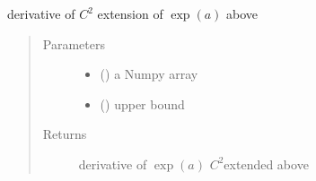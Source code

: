 \documentclass[letterpaper,10pt,english]{sphinxmanual}
\begin{document}
\begin{fulllineitems}
\label{\detokenize{ipfp_utils:ipfp_utils.der_npexp}}
derivative of \(C^2\) extension of  \(\exp(a)\) above 
\begin{quote}\begin{description}
\item[{Parameters}] \leavevmode\begin{itemize}
\item {} 
 () \textendash{} a Numpy array

\item {} 
 () \textendash{} upper bound

\end{itemize}

\item[{Returns}] \leavevmode
derivative of  \(\exp(a)\)  \(C^2\)\sphinxhyphen{}extended above 

\end{description}\end{quote}

\end{fulllineitems}

\end{document}

